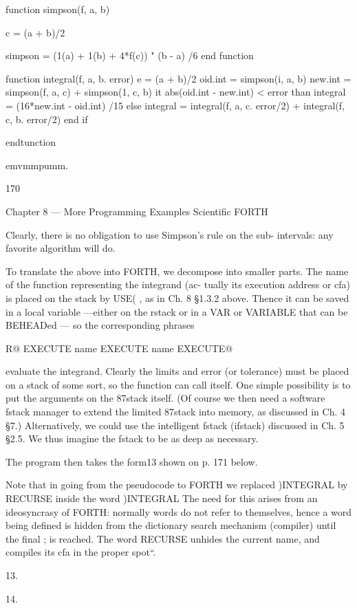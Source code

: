 function simpson(f, a, b)

c = (a + b)/2

simpson = (1(a) + 1(b) + 4*f(c)) " (b - a) /6
end function

function integral(f, a, b. error)
e = (a + b)/2
oid.int = simpson(i, a, b)
new.int = simpson(f, a, c) + simpson(1, c, b)
it abs(oid.int - new.int) < error than
integral = (16*new.int - oid.int) /15
else
integral = integral(f, a, c. error/2) +
integral(f, c, b. error/2)
end if

endtunction

emvmmpumm.

170

Chapter 8 — More Programming Examples Scientiﬁc FORTH

Clearly, there is no obligation to use Simpson's rule on the sub-
intervals: any favorite algorithm will do.

To translate the above into FORTH, we decompose into smaller
parts. The name of the function representing the integrand (ac-
tually its execution address or cfa) is placed on the stack by USE( ,
as in Ch. 8 §1.3.2 above. Thence it can be saved in a local variable
—either on the rstack or in a VAR or VARIABLE that can be
BEHEADed — so the corresponding phrases

R@ EXECUTE \rstack
name EXECUTE \VAFI
name EXECUTE@ \VARIABLE

evaluate the integrand. Clearly the limits and error (or tolerance)
must be placed on a stack of some sort, so the function can call
itself. One simple possibility is to put the arguments on the
87stack itself. (Of course we then need a software fstack manager
to extend the limited 87stack into memory, as discussed in
Ch. 4 §7.) Alternatively, we could use the intelligent fstack
(ifstack) discussed in Ch. 5 §2.5. We thus imagine the fstack to be
as deep as necessary.

The program then takes the form13 shown on p. 171 below.

Note that in going from the pseudocode to FORTH we replaced
)INTEGRAL by RECURSE inside the word )INTEGRAL The
need for this arises from an ideosyncrasy of FORTH: normally
words do not refer to themselves, hence a word being deﬁned is
hidden from the dictionary search mechanism (compiler) until
the ﬁnal ; is reached. The word RECURSE unhides the current
name, and compiles its cfa in the proper spot“.

 

13.

14.

